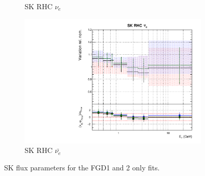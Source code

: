 \begin{figure}
\begin{subfigure}{0.45\textwidth}
  \caption{SK RHC $\nu_{e}$}
\end{subfigure}
\begin{subfigure}{0.45\textwidth}
  \centering
  \includegraphics[width=0.75\linewidth]{figs/fgdfitsflux_15}
  \caption{SK RHC $\bar{\nu_e}$}
\end{subfigure}
\caption{SK flux parameters for the FGD1 and 2 only fits.}
\label{fig:fgdfluxSK}
\end{figure}

